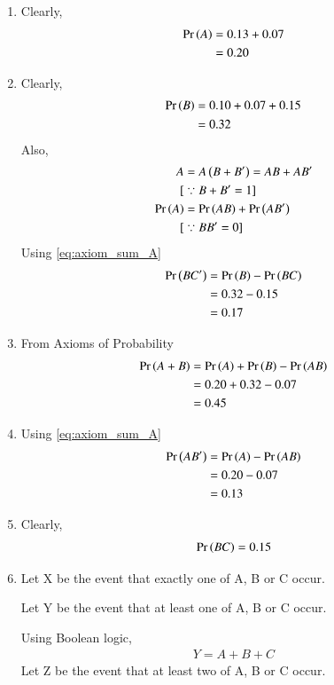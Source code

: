 \documentclass[journal,12pt,twocolumn]{IEEEtran}
\begin{document}
\begin{enumerate}[label=(\alph*)]
\item 
Clearly,
\begin{align}
\Pr\left(A\right) &= 0.13 + 0.07\\
       &= 0.20
\end{align}
\item 
Clearly,
\begin{align}
\label{eq:1}
    \Pr\left(B\right) &= 0.10 + 0.07 + 0.15\\
       &= 0.32
\end{align}
Also,
\begin{align}
A &= A \left(B+B^{\prime}\right) =  AB + AB^{\prime}\\
[&\because B + B^\prime = 1]\\\label{eq:axiom_sum_A}
\Pr\left(A\right) &= \Pr\left(AB\right) +\Pr\left(AB^\prime\right)\\
    [&\because BB^\prime = 0] \nonumber
\end{align}
Using \eqref{eq:axiom_sum_A}
\begin{align}
    \Pr\left(BC^\prime\right) &= \Pr\left(B\right) - \Pr\left(BC\right) \\
    &= 0.32 - 0.15\\
    &= 0.17
\end{align}
\item 
From Axioms of Probability
\begin{align}
\label{Axioms}
    \Pr\left(A + B\right) &= \Pr\left(A\right) + \Pr\left(B\right) - \Pr\left(AB\right)\\
    &= 0.20 + 0.32 - 0.07\\
    &= 0.45
\end{align}
\item 
Using \eqref{eq:axiom_sum_A}
\begin{align}
    \Pr\left(AB^\prime\right) &= \Pr\left(A\right) - \Pr\left(AB\right) \\
    &= 0.20 - 0.07\\
    &= 0.13
\end{align}
\item 
Clearly,
\begin{align}
    \Pr\left(BC\right) = 0.15
\end{align}
\item 
Let X be the event that exactly one of A, B or C occur.

Let Y be the event that at least one of A, B or C occur.

Using Boolean logic,
\begin{align}
    Y=A+B+C
\end{align}
Let Z be the event that at least two of A, B or C occur.


\end{enumerate}
\end{document}
